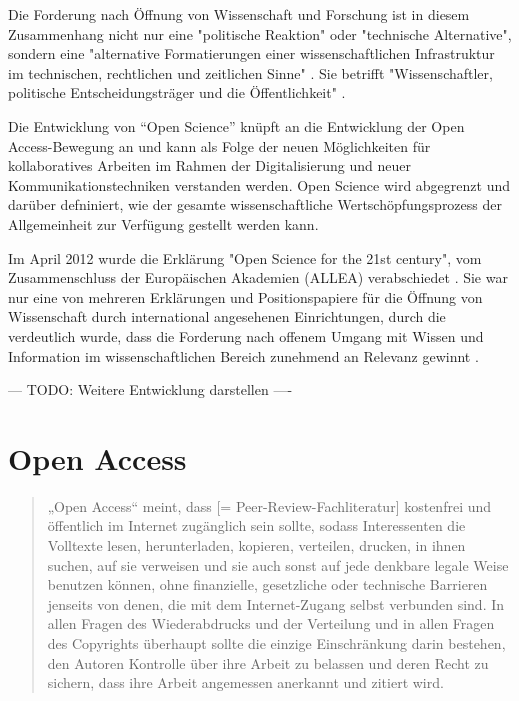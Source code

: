Die Forderung nach Öffnung von Wissenschaft und Forschung ist in diesem Zusammenhang nicht nur eine "politische Reaktion" oder "technische Alternative", sondern eine "alternative Formatierungen einer wissenschaftlichen Infrastruktur im technischen, rechtlichen und zeitlichen Sinne" \cite{kelty_2004}. Sie betrifft "Wissenschaftler, politische Entscheidungsträger und die Öffentlichkeit" \cite{Scheliga_2014}.

Die Entwicklung von “Open Science” knüpft an die Entwicklung der Open Access-Bewegung an und kann als Folge der neuen Möglichkeiten für kollaboratives Arbeiten im Rahmen der Digitalisierung und neuer Kommunikationstechniken verstanden werden. Open Science wird abgegrenzt und darüber defniniert, wie der gesamte wissenschaftliche Wertschöpfungsprozess der Allgemeinheit zur Verfügung gestellt werden kann. 

Im April 2012 wurde die Erklärung "Open Science for the 21st century", vom Zusammenschluss der Europäischen Akademien (ALLEA) verabschiedet \cite{ALLEA_2012}. Sie war nur eine von mehreren Erklärungen und Positionspapiere für die Öffnung von Wissenschaft durch international angesehenen Einrichtungen, durch die verdeutlich wurde, dass die Forderung nach offenem Umgang mit Wissen und Information im wissenschaftlichen Bereich zunehmend an Relevanz gewinnt \cite{schulze_2013_open}.

--- TODO: Weitere Entwicklung darstellen ----

\section{Open Access} 

\begin{quote}
„Open Access“ meint, dass [= Peer-Review-Fachliteratur] kostenfrei und öffentlich im Internet zugänglich sein sollte, sodass Interessenten die Volltexte lesen, herunterladen, kopieren, verteilen, drucken, in ihnen suchen, auf sie verweisen und sie auch sonst auf jede denkbare legale Weise benutzen können, ohne finanzielle, gesetzliche oder technische Barrieren jenseits von denen, die mit dem Internet-Zugang selbst verbunden sind. In allen Fragen des Wiederabdrucks und der Verteilung und in allen Fragen des Copyrights überhaupt sollte die einzige Einschränkung darin bestehen, den Autoren Kontrolle über ihre Arbeit zu belassen und deren Recht zu sichern, dass ihre Arbeit angemessen anerkannt und zitiert wird.
\cite{boai_2012}
\end{quote}

